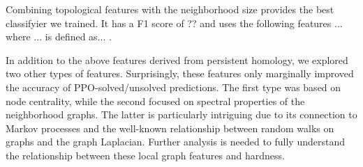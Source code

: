 Combining topological features with the neighborhood size provides the best classifyier we trained.
It has a F1 score of ?? and uses the following features ... where ... is defined as... .


In addition to the above features derived from persistent homology, we explored two other types of features.  
Surprisingly, these features only marginally improved the accuracy of PPO-solved/unsolved predictions.  
The first type was based on node centrality, while the second focused on spectral properties of the neighborhood graphs.  
The latter is particularly intriguing due to its connection to Markov processes and the well-known relationship between random walks on graphs and the graph Laplacian.  
Further analysis is needed to fully understand the relationship between these local graph features and hardness.